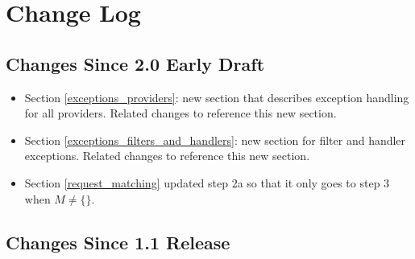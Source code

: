 \chapter{Change Log}

\section{Changes Since 2.0 Early Draft}

\begin{itemize}
\item Section \ref{exceptions_providers}: new section that describes exception handling for all providers. Related changes to reference this new section.
\item Section \ref{exceptions_filters_and_handlers}: new section for filter and handler exceptions. Related changes to reference this new section.
\item Section \ref{request_matching} updated step 2a so that it only goes to step 3 when $M \neq \{\}$. 
\end{itemize}

\section{Changes Since 1.1 Release}

